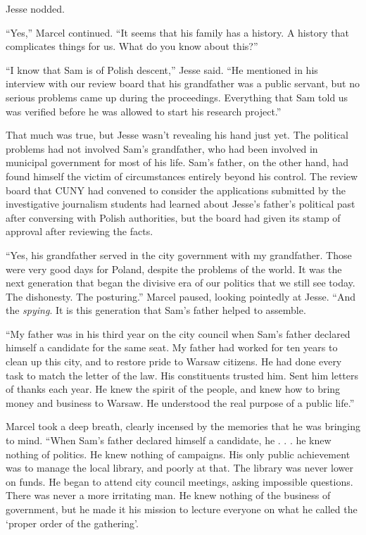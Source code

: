 \documentclass[12pt]{book}
\begin{document}
Jesse nodded.

``Yes,'' Marcel continued.  ``It seems that his family has a history.  A history that complicates things for us.  What do you know about this?''

``I know that Sam is of Polish descent,'' Jesse said.  ``He mentioned in his interview with our review board that his grandfather was a public servant, but no serious problems came up during the proceedings.  Everything that Sam told us was verified before he was allowed to start his research project.''

That much was true, but Jesse wasn't revealing his hand just yet.  The political problems had not involved Sam's grandfather, who had been involved in municipal government for most of his life.  Sam's father, on the other hand, had found himself the victim of circumstances entirely beyond his control.  The review board that CUNY had convened to consider the applications submitted by the investigative journalism students had learned about Jesse's father's political past after conversing with Polish authorities, but the board had given its stamp of approval after reviewing the facts.

``Yes, his grandfather served in the city government with my grandfather.  Those were very good days for Poland, despite the problems of the world.  It was the next generation that began the divisive era of our politics that we still see today.  The dishonesty.  The posturing.''  Marcel paused, looking pointedly at Jesse.  ``And the \emph{spying}.  It is this generation that Sam's father helped to assemble.

``My father was in his third year on the city council when Sam's father declared himself a candidate for the same seat.  My father had worked for ten years to clean up this city, and to restore pride to Warsaw citizens.  He had done every task to match the letter of the law.  His constituents trusted him.  Sent him letters of thanks each year.  He knew the spirit of the people, and knew how to bring money and business to Warsaw.  He understood the real purpose of a public life.''

Marcel took a deep breath, clearly incensed by the memories that he was bringing to mind.  ``When Sam's father declared himself a candidate, he . . . he knew nothing of politics.  He knew nothing of campaigns.  His only public achievement was to manage the local library, and poorly at that.  The library was never lower on funds.  He began to attend city council meetings, asking impossible questions.  There was never a more irritating man.  He knew nothing of the business of government, but he made it his mission to lecture everyone on what he called the `proper order of the gathering'.
\end{document}

